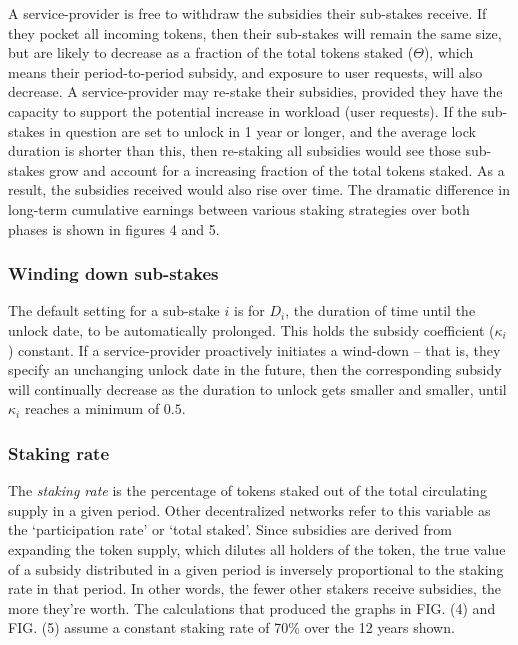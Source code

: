 \documentclass[longbibliography,nofootinbib]{revtex4-1}
\begin{document}
A service-provider is free to withdraw the subsidies their sub-stakes receive. If they pocket all incoming tokens, then their sub-stakes will remain the same size, but are likely to decrease as a fraction of the total tokens staked ($\Theta$), which means their period-to-period subsidy, and exposure to user requests, will also decrease. A service-provider may re-stake their subsidies, provided they have the capacity to support the potential increase in workload (user requests). If the sub-stakes in question are set to unlock in 1 year or longer, and the average lock duration is shorter than this, then re-staking all subsidies would see those sub-stakes grow and account for a increasing fraction of the total tokens staked. As a result, the subsidies received would also rise over time. The dramatic difference in long-term  cumulative earnings between various staking strategies over both phases is shown in figures 4 and 5. 

\subsubsection{Winding down sub-stakes}

The default setting for a sub-stake $i$ is for $D_i$, the duration of time until the unlock date, to be automatically prolonged. This holds the subsidy coefficient ($\kappa_i$) constant. If a service-provider proactively initiates a wind-down – that is, they specify an unchanging unlock date in the future, then the corresponding subsidy will continually decrease as the duration to unlock gets smaller and smaller, until $\kappa_i$ reaches a minimum of $0.5$.

\subsubsection{Staking rate}

The \textit{staking rate} is the percentage of tokens staked out of the total circulating supply in a given period. Other decentralized networks refer to this variable as the `participation rate' or `total staked'. Since subsidies are derived from expanding the token supply, which dilutes all holders of the token, the true value of a subsidy distributed in a given period is inversely proportional to the staking rate in that period. In other words, the fewer other stakers receive subsidies, the more they're worth. The calculations that produced the graphs in FIG. (4) and FIG. (5) assume a constant staking rate of 70\% over the 12 years shown.
\end{document}
